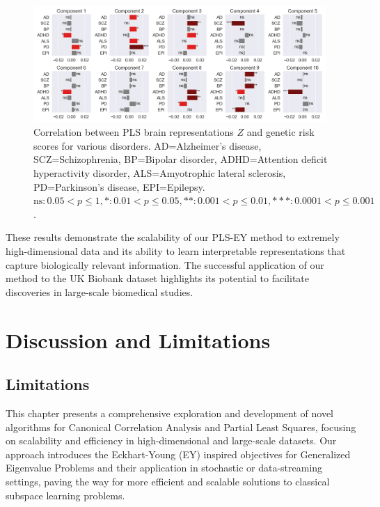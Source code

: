 \begin{figure}
\centering
\includegraphics[width=0.99\textwidth,trim={0.5cm 0cm 0.7cm 0cm}]{figures/UKBB/prs_correlations.png}
\caption{Correlation between PLS brain representations $Z$ and genetic risk scores for various disorders. AD=Alzheimer's disease, SCZ=Schizophrenia, BP=Bipolar disorder, ADHD=Attention deficit hyperactivity disorder, ALS=Amyotrophic lateral sclerosis, PD=Parkinson's disease, EPI=Epilepsy. $\text{ns}: 0.05 < p \leq 1, \ast: 0.01 < p \leq 0.05, \ast\ast: 0.001 < p \leq 0.01, \ast\ast\ast: 0.0001 < p \leq 0.001$.}
\label{fig:genetic_risk}
\end{figure}
These results demonstrate the scalability of our PLS-EY method to extremely high-dimensional data and its ability to learn interpretable representations that capture biologically relevant information. The successful application of our method to the UK Biobank dataset highlights its potential to facilitate discoveries in large-scale biomedical studies.

\section{Discussion and Limitations}\label{sec:discussion}

\subsection{Limitations}

This chapter presents a comprehensive exploration and development of novel algorithms for Canonical Correlation Analysis and Partial Least Squares, focusing on scalability and efficiency in high-dimensional and large-scale datasets.
Our approach introduces the Eckhart-Young (EY) inspired objectives for Generalized Eigenvalue Problems and their application in stochastic or data-streaming settings, paving the way for more efficient and scalable solutions to classical subspace learning problems.

